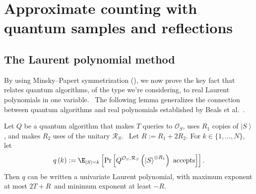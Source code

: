 \setcounter{section}{3}
\setcounter{theorem}{20}
\section{Approximate counting with quantum samples and reflections}

\label{sec:samplesreflections}

%
\subsection{The Laurent polynomial method}

\label{RESULT}\label{sec:lower}\label{sec:Laurent}

By using Minsky--Papert symmetrization (), we now prove the key
fact that relates quantum algorithms, of the type we're considering, to real
Laurent polynomials in one variable. \ The following lemma generalizes the
connection between quantum algorithms and real polynomials established by
Beals et al.\ \cite{bbcmw}.

\begin{lemma}
\label{laurentlem} Let $Q$ be a quantum algorithm that makes $T$ queries to $
\mathcal{O}_{S}$, uses $R_1$ copies of $\left\vert S\right\rangle $, and
makes $R_2$ uses of the unitary $\mathcal{R}_S$. \ Let $R:= R_1 + 2R_2$. 
For $k\in\{1,\ldots,N\}$, let
\begin{equation}
q\left( k\right) :=\E_{\left\vert S\right\vert =k}\left[ \Pr\left[ Q^{
\mathcal{O}_{S},\mathcal{R}_S}\left( \left\vert S\right\rangle ^{\otimes
R_1}\right) \text{ accepts}\right] \right] .
\end{equation}
Then $q$ can be written a univariate Laurent polynomial, with maximum 
exponent at most $2T+R$\ and minimum exponent at least $-R$.
\end{lemma}

